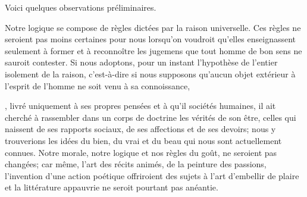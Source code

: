 \documentclass[11pt,a4paper]{article}
\begin{document}
Voici quelques observations préliminaires.

Notre logique se compose  de règles dictées
par la raison universelle. Ces règles ne seroient pas moins certaines
pour nous lorsqu'on  voudroit qu'elles enseignassent
seulement à former et à reconnoître les jugemens que tout homme de bon
sens ne sauroit contester. Si nous adoptons, pour un instant
l'hypothèse de l'entier isolement de la raison, c'est-à-dire si nous
supposons qu'aucun objet extérieur à l'esprit de l'homme ne soit venu à
sa connoissance,

, livré uniquement à ses propres pensées et à 
qu'il  sociétés humaines, il ait cherché à
rassembler dans un corps de doctrine les vérités de son être, celles qui
naissent de ses rapports sociaux, de ses affections et de ses devoirs;
nous y trouverions  les idées du bien, du vrai et du beau
 qui nous sont actuellement connues.
Notre morale, notre logique et nos règles du goût, ne seroient
\struck{\ill{}} pas changées; car  même, l'art  des récits animés, de la peinture des
passions,  l'invention d'une action
poétique offriroient  des sujets à l'art d'embellir
 de plaire et la littérature appauvrie ne seroit
pourtant pas anéantie.
\end{document}
